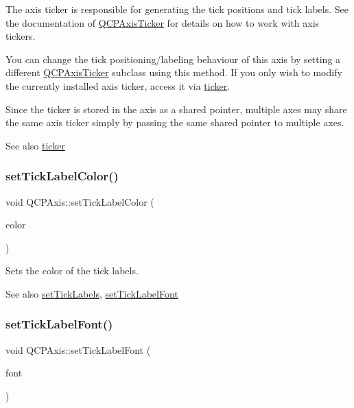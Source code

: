 The axis ticker is responsible for generating the tick positions and tick labels. See the documentation of \hyperlink{class_q_c_p_axis_ticker}{Q\+C\+P\+Axis\+Ticker} for details on how to work with axis tickers.

You can change the tick positioning/labeling behaviour of this axis by setting a different \hyperlink{class_q_c_p_axis_ticker}{Q\+C\+P\+Axis\+Ticker} subclass using this method. If you only wish to modify the currently installed axis ticker, access it via \hyperlink{class_q_c_p_axis_a7b7a27151be8235059e1294f73ecf615}{ticker}.

Since the ticker is stored in the axis as a shared pointer, multiple axes may share the same axis ticker simply by passing the same shared pointer to multiple axes.

\begin{DoxySeeAlso}{See also}
\hyperlink{class_q_c_p_axis_a7b7a27151be8235059e1294f73ecf615}{ticker} 
\end{DoxySeeAlso}
\mbox{\label{class_q_c_p_axis_a395e445c3fe496b935bee7b911ecfd1c}} 
\subsubsection{\texorpdfstring{set\+Tick\+Label\+Color()}{setTickLabelColor()}}
{\footnotesize\ttfamily void Q\+C\+P\+Axis\+::set\+Tick\+Label\+Color (\begin{DoxyParamCaption}\item[{const Q\+Color \&}]{color }\end{DoxyParamCaption})}

Sets the color of the tick labels.

\begin{DoxySeeAlso}{See also}
\hyperlink{class_q_c_p_axis_a04ba16e1f6f78d70f938519576ed32c8}{set\+Tick\+Labels}, \hyperlink{class_q_c_p_axis_a2b8690c4e8dbc39d9185d2b398ce7a6c}{set\+Tick\+Label\+Font} 
\end{DoxySeeAlso}
\mbox{\label{class_q_c_p_axis_a2b8690c4e8dbc39d9185d2b398ce7a6c}} 
\subsubsection{\texorpdfstring{set\+Tick\+Label\+Font()}{setTickLabelFont()}}
{\footnotesize\ttfamily void Q\+C\+P\+Axis\+::set\+Tick\+Label\+Font (\begin{DoxyParamCaption}\item[{const Q\+Font \&}]{font }\end{DoxyParamCaption})}


